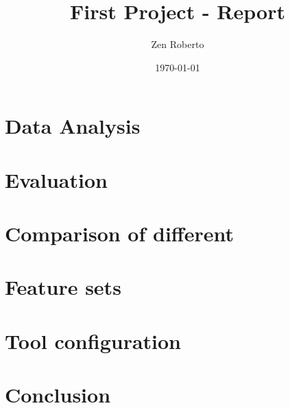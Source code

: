 \documentclass[a4paper,8pt,oneside]{book}
\author{Zen Roberto}
\title{\vspace{-4em} \LARGE First Project - Report}
\date{\today}
\begin{document}




\frontmatter
\tableofcontents

\mainmatter

\section{Data Analysis}

\section{Evaluation}

\section{Comparison of different}

\section{Feature sets}

\section{Tool configuration}

\section{Conclusion}

% 
% 
\end{document}
